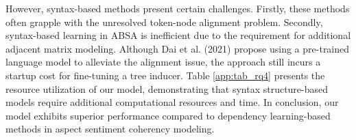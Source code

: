 However, syntax-based methods present certain challenges. Firstly, these methods often grapple with the unresolved token-node alignment problem. Secondly, syntax-based learning in ABSA is inefficient due to the requirement for additional adjacent matrix modeling. Although Dai et al. (2021) propose using a pre-trained language model to alleviate the alignment issue, the approach still incurs a startup cost for fine-tuning a tree inducer. Table \ref{app:tab_rq4} presents the resource utilization of our model, demonstrating that syntax structure-based models require additional computational resources and time. In conclusion, our model exhibits superior performance compared to dependency learning-based methods in aspect sentiment coherency modeling.
